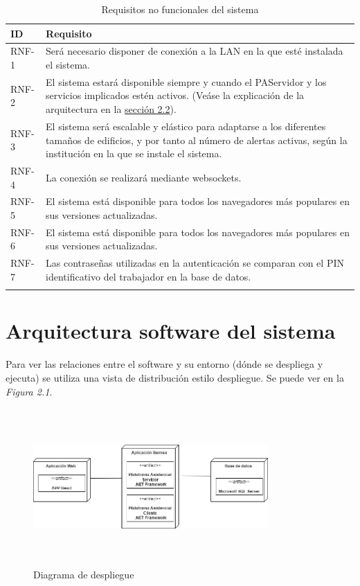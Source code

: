 \begin{longtable}{|p{}|p{}|}
	\hline
	\textbf{ID} & \textbf{Requisito} \\
	\hline
	RNF-1 	& 	Será necesario disponer de conexión a la LAN en la que esté instalada el sistema. \\
	\hline
	RNF-2	&	El sistema estará disponible siempre y cuando el PAServidor y los servicios implicados estén activos. (Veáse la explicación de la arquitectura en la \hyperref[section-arquitectura]{sección 2.2}).	\\
	\hline
	RNF-3	&	El sistema será escalable y elástico para adaptarse a los diferentes tamaños de edificios, y por tanto al número de alertas activas, según la institución en la que se instale el sistema.\\
	\hline
	RNF-4	&	La conexión se realizará mediante websockets.\\
	\hline
	RNF-5	&	El sistema está disponible para todos los navegadores más populares en sus versiones actualizadas.\\
	\hline
	RNF-6	&	El sistema está disponible para todos los navegadores más populares en sus versiones actualizadas.\\
	\hline
	RNF-7	&	Las contraseñas utilizadas en la autenticación se comparan con el PIN identificativo del trabajador en la base de datos. \\
	\hline
\caption{Requisitos no funcionales del sistema}
\label{tab:RNF}
\end{longtable}

\section{Arquitectura software del sistema}
\label{section-arquitectura}


Para ver las relaciones entre el software y su entorno (dónde se despliega y ejecuta) se utiliza una vista de distribución estilo despliegue. Se puede ver en la \textit{Figura 2.1}. \newline

\begin{figure}[!h]
    \centering
    \includegraphics[width=0.8\textwidth,height=6cm]{Imagenes/Arquitectura_Sistema}
    \caption{Diagrama de despliegue}
    \label{fig:despliegue}
\end{figure}

